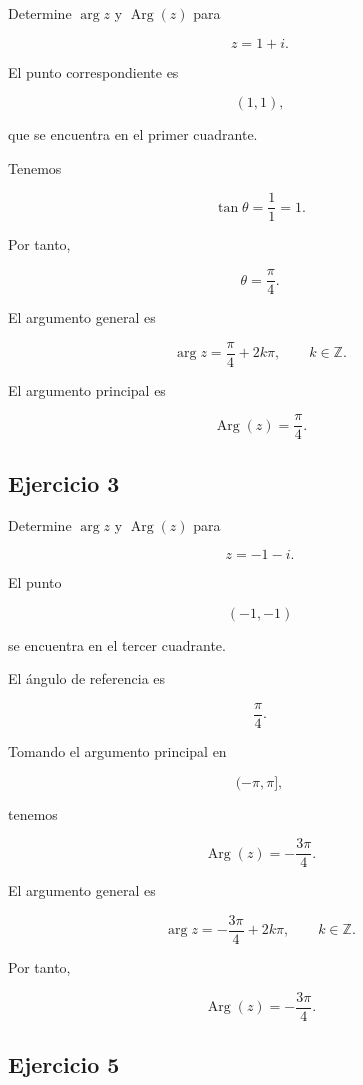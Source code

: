 \documentclass[12pt]{article}
\begin{document}
Determine \(\arg z\) y \(\operatorname{Arg}(z)\) para

\[
z=1+i.
\]

El punto correspondiente es

\[
(1,1),
\]

que se encuentra en el primer cuadrante.

Tenemos

\[
\tan\theta
=
\frac{1}{1}=1.
\]

Por tanto,

\[
\theta=\frac{\pi}{4}.
\]

El argumento general es

\[
\boxed{
\arg z
=
\frac{\pi}{4}+2k\pi,
\qquad k\in\mathbb{Z}
}.
\]

El argumento principal es

\[
\boxed{
\operatorname{Arg}(z)=\frac{\pi}{4}
}.
\]


\subsection*{Ejercicio 3}

Determine \(\arg z\) y \(\operatorname{Arg}(z)\) para

\[
z=-1-i.
\]

El punto

\[
(-1,-1)
\]

se encuentra en el tercer cuadrante.

El ángulo de referencia es

\[
\frac{\pi}{4}.
\]

Tomando el argumento principal en

\[
(-\pi,\pi],
\]

tenemos

\[
\operatorname{Arg}(z)
=
-\frac{3\pi}{4}.
\]

El argumento general es

\[
\boxed{
\arg z
=
-\frac{3\pi}{4}+2k\pi,
\qquad
k\in\mathbb{Z}
}.
\]

Por tanto,

\[
\boxed{
\operatorname{Arg}(z)
=
-\frac{3\pi}{4}
}.
\]


\subsection*{Ejercicio 5}
\end{document}
